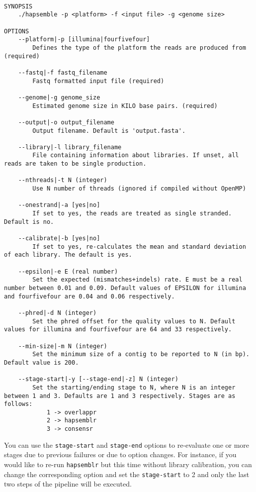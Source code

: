 \documentclass[12pt,a4paper]{report}
\begin{document}
\begin{lstlisting}

SYNOPSIS
    ./hapsemble -p <platform> -f <input file> -g <genome size>
 
OPTIONS
    --platform|-p [illumina|fourfivefour]
        Defines the type of the platform the reads are produced from (required)
     
    --fastq|-f fastq_filename
        Fastq formatted input file (required)
     
    --genome|-g genome_size
        Estimated genome size in KILO base pairs. (required)
     
    --output|-o output_filename
        Output filename. Default is 'output.fasta'.
     
    --library|-l library_filename
        File containing information about libraries. If unset, all reads are taken to be single production.
     
    --nthreads|-t N (integer)
        Use N number of threads (ignored if compiled without OpenMP)
     
    --onestrand|-a [yes|no]
        If set to yes, the reads are treated as single stranded. Default is no.
     
    --calibrate|-b [yes|no]
        If set to yes, re-calculates the mean and standard deviation of each library. The default is yes.
     
    --epsilon|-e E (real number)
        Set the expected (mismatches+indels) rate. E must be a real number between 0.01 and 0.09. Default values of EPSILON for illumina and fourfivefour are 0.04 and 0.06 respectively.
     
    --phred|-d N (integer)
        Set the phred offset for the quality values to N. Default values for illumina and fourfivefour are 64 and 33 respectively.
     
    --min-size|-m N (integer)
        Set the minimum size of a contig to be reported to N (in bp). Default value is 200.
     
    --stage-start|-y [--stage-end|-z] N (integer)
        Set the starting/ending stage to N, where N is an integer between 1 and 3. Defaults are 1 and 3 respectively. Stages are as follows:
            1 -> overlappr
            2 -> hapsemblr
            3 -> consensr

\end{lstlisting}

You can use the \texttt{stage-start} and \texttt{stage-end} options to re-evaluate one or more stages due to previous failures or due to option changes. For instance, if you would like to re-run \texttt{hapsemblr} but this time without library calibration, you can change the corresponding option and set the \texttt{stage-start} to 2 and only the last two steps of the pipeline will be executed. 
\end{document}
